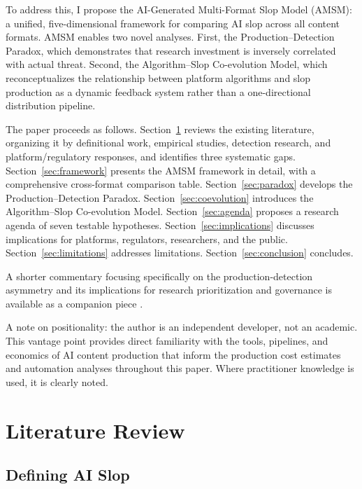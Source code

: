 \documentclass[12pt,a4paper]{article}
\begin{document}
To address this, I propose the AI-Generated Multi-Format Slop Model (AMSM): a unified, five-dimensional framework for comparing AI slop across all content formats. AMSM enables two novel analyses. First, the Production--Detection Paradox, which demonstrates that research investment is inversely correlated with actual threat. Second, the Algorithm--Slop Co-evolution Model, which reconceptualizes the relationship between platform algorithms and slop production as a dynamic feedback system rather than a one-directional distribution pipeline.

The paper proceeds as follows. Section~\ref{sec:literature} reviews the existing literature, organizing it by definitional work, empirical studies, detection research, and platform/regulatory responses, and identifies three systematic gaps. Section~\ref{sec:framework} presents the AMSM framework in detail, with a comprehensive cross-format comparison table. Section~\ref{sec:paradox} develops the Production--Detection Paradox. Section~\ref{sec:coevolution} introduces the Algorithm--Slop Co-evolution Model. Section~\ref{sec:agenda} proposes a research agenda of seven testable hypotheses. Section~\ref{sec:implications} discusses implications for platforms, regulators, researchers, and the public. Section~\ref{sec:limitations} addresses limitations. Section~\ref{sec:conclusion} concludes.

A shorter commentary focusing specifically on the production-detection asymmetry and its implications for research prioritization and governance is available as a companion piece \parencite{author2026pda}.

A note on positionality: the author is an independent developer, not an academic. This vantage point provides direct familiarity with the tools, pipelines, and economics of AI content production that inform the production cost estimates and automation analyses throughout this paper. Where practitioner knowledge is used, it is clearly noted.


\section{Literature Review}
\label{sec:literature}

\subsection{Defining AI Slop}
\end{document}
